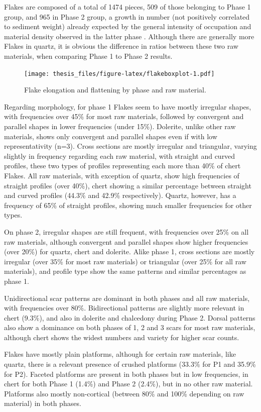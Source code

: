 \documentclass[12pt,twoside]{reedthesis}
\begin{document}
Flakes are composed of a total of 1474 pieces, 509 of those belonging to Phase 1 group, and 965 in Phase 2 group, a growth in number (not positively correlated to sediment weight) already expected by the general intensity of occupation and material density observed in the latter phase . Although there are generally more Flakes in quartz, it is obvious the difference in ratios between these two raw materials, when comparing Phase 1 to Phase 2 results.
\begin{figure}
\centering
\texttt{[image: thesis\_files/figure-latex/flakeboxplot-1.pdf]}
\caption{\label{fig:flakeboxplot}Flake elongation and flattening by phase and raw material.}
\end{figure}
Regarding morphology, for phase 1 Flakes seem to have mostly irregular shapes, with frequencies over 45\% for most raw materials, followed by convergent and parallel shapes in lower frequencies (under 15\%). Dolerite, unlike other raw materials, shows only convergent and parallel shapes even if with low representativity (n=3). Cross sections are mostly irregular and triangular, varying slightly in frequency regarding each raw material, with straight and curved profiles, these two types of profiles representing each more than 40\% of chert Flakes. All raw materials, with exception of quartz, show high frequencies of straight profiles (over 40\%), chert showing a similar percentage between straight and curved profiles (44.3\% and 42.9\% respectively). Quartz, however, has a frequency of 65\% of straight profiles, showing much smaller frequencies for other types.

On phase 2, irregular shapes are still frequent, with frequencies over 25\% on all raw materials, although convergent and parallel shapes show higher frequencies (over 20\%) for quartz, chert and dolerite. Alike phase 1, cross sections are mostly irregular (over 35\% for most raw materials) or triangular (over 25\% for all raw materials), and profile type show the same patterns and similar percentages as phase 1.

Unidirectional scar patterns are dominant in both phases and all raw materials, with frequencies over 80\%. Bidirectional patterns are slightly more relevant in chert (9.3\%), and also in dolerite and chalcedony during Phase 2. Dorsal patterns also show a dominance on both phases of 1, 2 and 3 scars for most raw materials, although chert shows the widest numbers and variety for higher scar counts.

Flakes have mostly plain platforms, although for certain raw materials, like quartz, there is a relevant presence of crushed platforms (33.3\% for P1 and 35.9\% for P2). Faceted platforms are present in both phases but in low frequencies, in chert for both Phase 1 (1.4\%) and Phase 2 (2.4\%), but in no other raw material. Platforms also mostly non-cortical (between 80\% and 100\% depending on raw material) in both phases.
\end{document}
